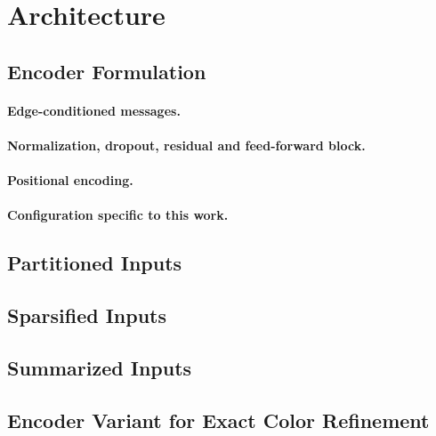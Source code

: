 \section{Architecture}
\label{sec:method:architecture}

\subsection{Encoder Formulation}
\label{sec:method:architecture:equations}

\paragraph{Edge-conditioned messages.}

\paragraph{Normalization, dropout, residual and feed-forward block.}

\paragraph{Positional encoding.}

\paragraph{Configuration specific to this work.}

\subsection{Partitioned Inputs}
\label{sec:method:architecture:partitioning}

\subsection{Sparsified Inputs}
\label{sec:method:architecture:sparsification}

\subsection{Summarized Inputs}
\label{sec:method:architecture:summarization}

\subsection{Encoder Variant for Exact Color Refinement}
\label{sec:method:architecture:exact}
